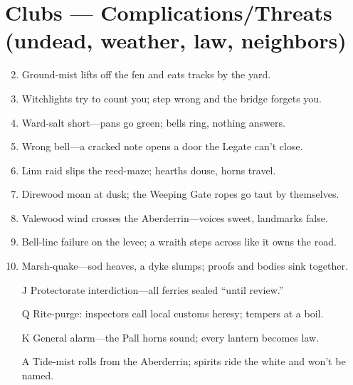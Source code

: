 \section*{Clubs --- Complications/Threats (undead, weather, law, neighbors)}
\begin{enumerate}
\setcounter{enumi}{1}
\item Ground-mist lifts off the fen and eats tracks by the yard.
\item Witchlights try to count you; step wrong and the bridge forgets you.
\item Ward-salt short---pans go green; bells ring, nothing answers.
\item Wrong bell---a cracked note opens a door the Legate can't close.
\item Linn raid slips the reed-maze; hearths douse, horns travel.
\item Direwood moan at dusk; the Weeping Gate ropes go taut by themselves.
\item Valewood wind crosses the Aberderrin---voices sweet, landmarks false.
\item Bell-line failure on the levee; a wraith steps across like it owns the road.
\item Marsh-quake---sod heaves, a dyke slumps; proofs and bodies sink together.
\item[J] Protectorate interdiction---all ferries sealed ``until review.''
\item[Q] Rite-purge: inspectors call local customs heresy; tempers at a boil.
\item[K] General alarm---the Pall horns sound; every lantern becomes law.
\item[A] Tide-mist rolls from the Aberderrin; spirits ride the white and won't be named.
\end{enumerate}

